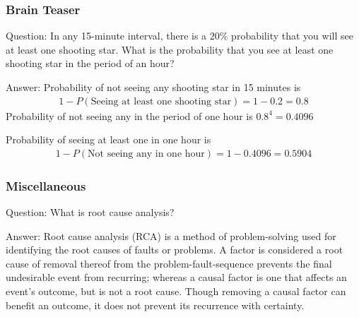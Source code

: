 \documentclass[11pt]{beamer}
\begin{document}
\begin{frame}
\frametitle{Brain Teaser}
\begin{block}{Question:}
	In any 15-minute interval, there is a $20\%$ probability that you will see at least one shooting star. What is the proba­bility that you see at least one shooting star in the period of an hour?
\end{block}
\begin{block}{Answer:}
	Probability of not seeing any shooting star in 15 minutes is
	\begin{align*}
		1 - P(\text{Seeing at least one shooting star})= 1- 0.2=0.8
	\end{align*}
	Probability of not seeing any in the period of one hour is $0.8^4=0.4096$
	
	Probability of seeing at least one in one hour is
	\begin{align*}
	1 - P(\text{Not seeing any in one hour})= 1- 0.4096=0.5904
	\end{align*}
\end{block}
\end{frame}

\begin{frame}
\frametitle{Miscellaneous}
\begin{block}{Question:}
	What is root cause analysis?
\end{block}
\begin{block}{Answer:}
	Root cause analysis (RCA) is a method of problem-solving used for identifying the root causes of faults or problems. A factor is considered a root cause of removal thereof from the problem-fault-sequence prevents the final undesirable event from recurring; whereas a causal factor is one that affects an event's outcome, but is not a root cause. Though removing a causal factor can benefit an outcome, it does not prevent its recurrence with certainty.
\end{block}
\end{frame}
\end{document}
